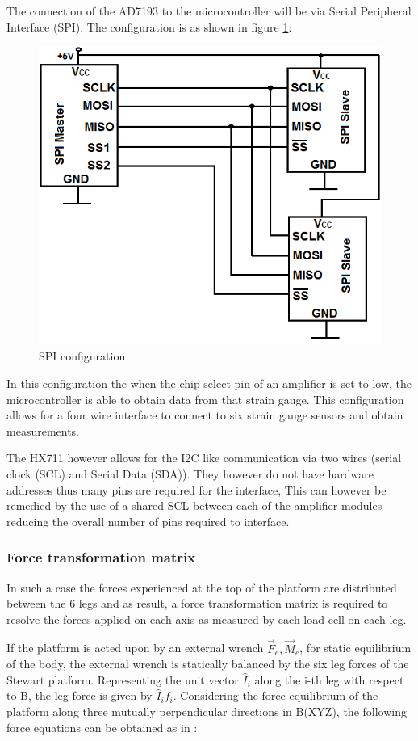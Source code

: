 The connection of the AD7193 to the microcontroller will be via Serial Peripheral Interface (SPI). The configuration is as shown in figure \ref{spi}:
\begin{center}
\begin{figure}[H]
\centering
\includegraphics[width=0.55\linewidth]{Figures/SPI}
\caption[SPI configuration]{SPI configuration}
\label{spi}
\end{figure}
\end{center}
In this configuration the when the chip select pin of an amplifier is set to low, the microcontroller is able to obtain data from that strain gauge. This configuration allows for a four wire interface to connect to six strain gauge sensors and obtain measurements.

The HX711 however allows for the I2C like communication via two wires (serial clock (SCL) and Serial Data (SDA)). They however do not have hardware addresses thus many pins are required for the interface, This can however be remedied by the use of a shared SCL between each of the amplifier modules reducing the overall number of pins required to interface.

\subsubsection*{Force transformation matrix} 
In such a case the forces experienced at the top of the platform are distributed between the 6 legs and as result, a force transformation matrix is required to resolve the forces applied on each axis as measured by each load cell on each leg. 

If the platform is acted upon by an external wrench {$\vec{F}_e, \vec{M}_e$}, for static equilibrium of the body, the external wrench is statically balanced by the six leg forces of the Stewart platform. Representing the unit vector $\hat{I}_i$ along the i-th leg with respect to B, the leg force is given  by $\hat{I}_if_i$. Considering the force equilibrium of the platform along  three mutually perpendicular directions in B(XYZ), the following force equations can be obtained as in \cite{dwarakanath_design_2001}:

